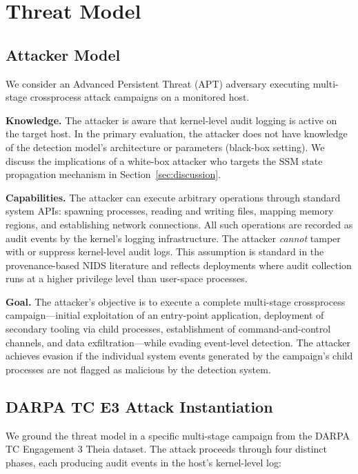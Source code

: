 \documentclass[letterpaper,twocolumn,10pt]{article}
\begin{document}
\section{Threat Model}
\label{sec:threat_model}

\subsection{Attacker Model}
\label{sec:attacker_model}

We consider an Advanced Persistent Threat (APT) adversary executing multi-stage crossprocess attack campaigns on a monitored host.

\textbf{Knowledge.} The attacker is aware that kernel-level audit logging is active on the target host. In the primary evaluation, the attacker does not have knowledge of the detection model's architecture or parameters (black-box setting). We discuss the implications of a white-box attacker who targets the SSM state propagation mechanism in Section~\ref{sec:discussion}.

\textbf{Capabilities.} The attacker can execute arbitrary operations through standard system APIs: spawning processes, reading and writing files, mapping memory regions, and establishing network connections. All such operations are recorded as audit events by the kernel's logging infrastructure. The attacker \emph{cannot} tamper with or suppress kernel-level audit logs. This assumption is standard in the provenance-based NIDS literature and reflects deployments where audit collection runs at a higher privilege level than user-space processes.

\textbf{Goal.} The attacker's objective is to execute a complete multi-stage crossprocess campaign---initial exploitation of an entry-point application, deployment of secondary tooling via child processes, establishment of command-and-control channels, and data exfiltration---while evading event-level detection. The attacker achieves evasion if the individual system events generated by the campaign's child processes are not flagged as malicious by the detection system.

\subsection{DARPA TC E3 Attack Instantiation}
\label{sec:attack_instantiation}

We ground the threat model in a specific multi-stage campaign from the DARPA TC Engagement 3 Theia dataset. The attack proceeds through four distinct phases, each producing audit events in the host's kernel-level log:
\end{document}
